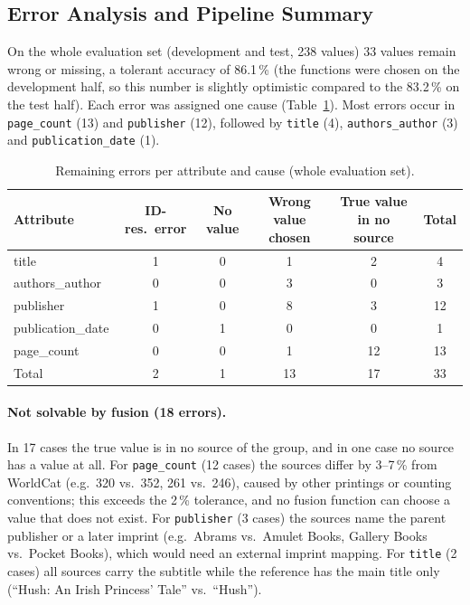 \documentclass[a4paper,11pt]{article}
\begin{document}
\subsection{Error Analysis and Pipeline Summary}\label{sec:errors}
On the whole evaluation set (development and test, 238 values) 33 values remain
wrong or missing, a tolerant accuracy of 86.1\,\% (the functions were chosen on the
development half, so this number is slightly optimistic compared to the 83.2\,\%
on the test half). Each error was assigned one cause (Table~\ref{tab:errors}).
Most errors occur in \texttt{page\_count} (13) and \texttt{publisher} (12),
followed by \texttt{title} (4), \texttt{authors\_author} (3) and
\texttt{publication\_date} (1).

\begin{table}[t]
\centering
\caption{Remaining errors per attribute and cause (whole evaluation set).}
\label{tab:errors}
\small
\begin{tabular}{lcccc|c}
\toprule
Attribute & ID-res.\ error & No value & Wrong value chosen & True value in no source & Total \\
\midrule
title            & 1 & 0 & 1 & 2  & 4  \\
authors\_author  & 0 & 0 & 3 & 0  & 3  \\
publisher        & 1 & 0 & 8 & 3  & 12 \\
publication\_date& 0 & 1 & 0 & 0  & 1  \\
page\_count      & 0 & 0 & 1 & 12 & 13 \\
\midrule
Total            & 2 & 1 & 13 & 17 & 33 \\
\bottomrule
\end{tabular}
\end{table}

\paragraph{Not solvable by fusion (18 errors).}
In 17 cases the true value is in no source of the group, and in one case no source
has a value at all. For \texttt{page\_count} (12 cases) the sources differ by
3--7\,\% from WorldCat (e.g.\ 320 vs.\ 352, 261 vs.\ 246), caused by other printings
or counting conventions; this exceeds the 2\,\% tolerance, and no fusion function
can choose a value that does not exist. For \texttt{publisher} (3 cases) the
sources name the parent publisher or a later imprint (e.g.\ Abrams vs.\ Amulet
Books, Gallery Books vs.\ Pocket Books), which would need an external imprint
mapping. For \texttt{title} (2 cases) all sources carry the subtitle while the
reference has the main title only (``Hush: An Irish Princess' Tale'' vs.\
``Hush'').
\end{document}
